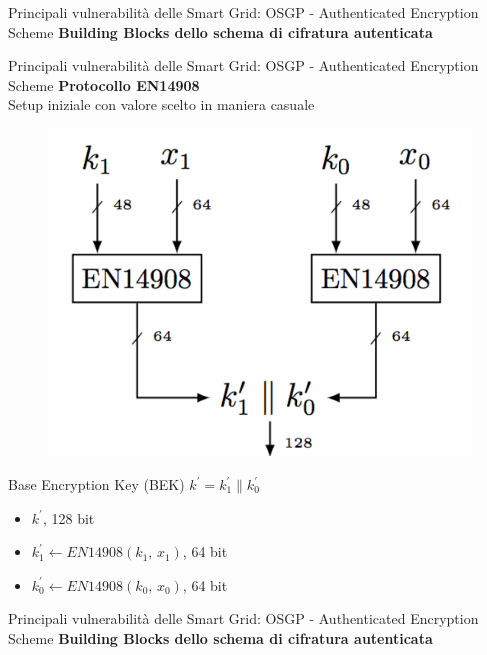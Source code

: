 \begin{frame}{Principali vulnerabilità delle Smart Grid: OSGP - Authenticated Encryption Scheme}
	\textbf{Building Blocks dello schema di cifratura autenticata}
\end{frame}

\begin{frame}{Principali vulnerabilità delle Smart Grid: OSGP - Authenticated Encryption Scheme}
	\textbf{Protocollo EN14908}\\
	Setup iniziale con valore scelto in maniera casuale
	\begin{figure}[h] 
		\includegraphics[scale=0.3,cfbox=blue_slides 1pt 0pt]{imgs/EN14908.png}
	\end{figure}
	Base Encryption Key (BEK) $k^{\prime} = k_1^{\prime} \| k_0^{\prime}$
		\begin{itemize}
			\item $k^{\prime}$, 128 bit
			\item $k_1^{\prime} \gets EN14908(k_1,\,x_1)$, 64 bit
			\item $k_0^{\prime} \gets EN14908(k_0,\,x_0)$, 64 bit
		\end{itemize}
\end{frame}

\begin{frame}{Principali vulnerabilità delle Smart Grid: OSGP - Authenticated Encryption Scheme}
	\textbf{Building Blocks dello schema di cifratura autenticata}
\end{frame}

